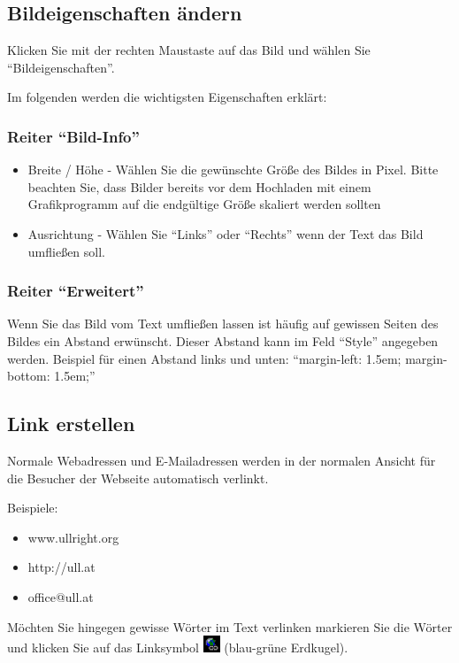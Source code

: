 \documentclass[article, a4paper, oneside, 11pt]{memoir}
\begin{document}
\subsection{Bildeigenschaften ändern}

Klicken Sie mit der rechten Maustaste auf das Bild und wählen Sie "`Bildeigenschaften"'.

Im folgenden werden die wichtigsten Eigenschaften erklärt:

\subsubsection{Reiter "`Bild-Info"'}

\begin{itemize}
\item Breite / Höhe - Wählen Sie die gewünschte Größe des Bildes in Pixel. Bitte beachten Sie, dass Bilder bereits vor dem Hochladen mit einem Grafikprogramm auf die endgültige Größe skaliert werden sollten
\item Ausrichtung - Wählen Sie "`Links"' oder "`Rechts"' wenn der Text das Bild umfließen soll.
\end{itemize}

\subsubsection{Reiter "`Erweitert"'}

Wenn Sie das Bild vom Text umfließen lassen ist häufig auf gewissen Seiten des Bildes ein Abstand erwünscht.
Dieser Abstand kann im Feld "`Style"' angegeben werden. Beispiel für einen Abstand links und unten: "`margin-left: 1.5em; margin-bottom: 1.5em;"'


\subsection{Link erstellen}

Normale Webadressen und E-Mailadressen werden in der normalen Ansicht für die Besucher der Webseite automatisch verlinkt.

Beispiele:

\begin{itemize}
\item www.ullright.org
\item http://ull.at
\item office@ull.at
\end{itemize}

Möchten Sie hingegen gewisse Wörter im Text verlinken markieren Sie die Wörter und klicken Sie auf das Linksymbol \includegraphics[height=5mm]{link_icon} (blau-grüne Erdkugel).
\end{document}
